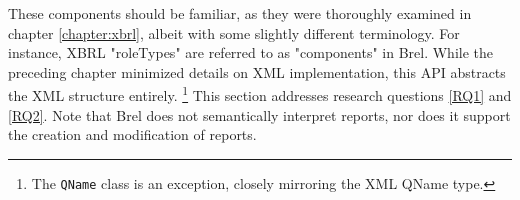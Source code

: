 These components should be familiar, as they were thoroughly examined in chapter \ref{chapter:xbrl},
albeit with some slightly different terminology. 
For instance, XBRL "roleTypes" are referred to as "components" in Brel.
While the preceding chapter minimized details on XML implementation, this API abstracts the XML structure entirely.
\footnote{The \texttt{QName} class is an exception, closely mirroring the XML QName type.}
This section addresses research questions \ref{RQ1} and \ref{RQ2}.
Note that Brel does not semantically interpret reports, 
nor does it support the creation and modification of reports.
